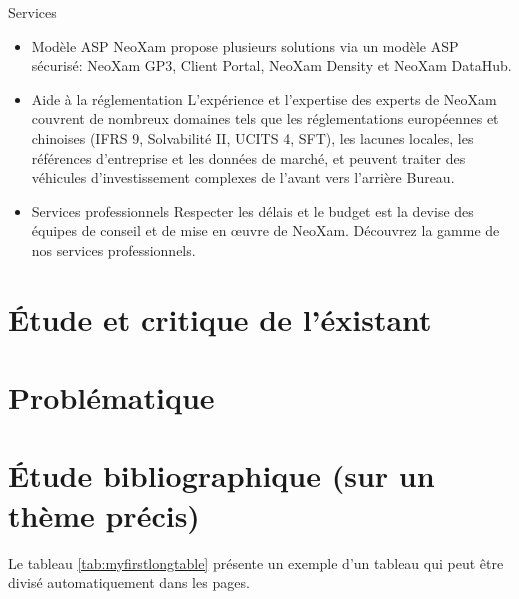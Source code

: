 \begin{subsection}{Services}
\begin{itemize}[label=\textbullet,font=\normalsize]
\item  Modèle ASP NeoXam propose plusieurs solutions via un modèle ASP sécurisé: NeoXam GP3, Client Portal, NeoXam Density et NeoXam DataHub.
\item  Aide à la réglementation  L'expérience et l'expertise des experts de NeoXam couvrent de nombreux domaines tels que les réglementations européennes et chinoises (IFRS 9, Solvabilité II, UCITS 4, SFT), les lacunes locales, les références d'entreprise et les données de marché, et peuvent traiter des véhicules d'investissement complexes de l'avant vers l'arrière Bureau.
\item Services professionnels Respecter les délais et le budget est la devise des équipes de conseil et de mise en œuvre de NeoXam. Découvrez la gamme de nos services professionnels.
\end{itemize} 

\end{subsection}








\section{\'Etude et critique de l'éxistant}
\section{Problématique}
\section{\'Etude bibliographique (sur un thème précis)}


Le tableau \ref{tab:myfirstlongtable} présente un exemple d'un tableau qui peut être divisé automatiquement dans les pages.

